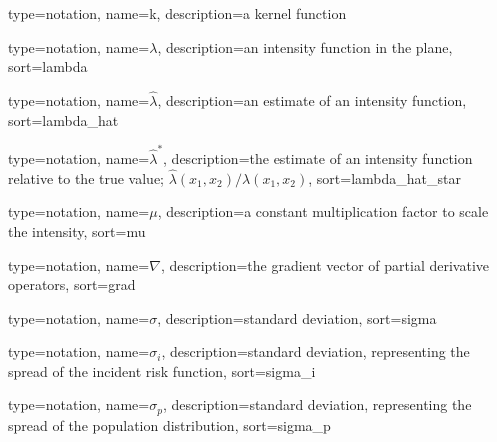 


{%
   type=notation,
   name={k},
   description={a kernel function}
}

{%
   type=notation,
   name={\ensuremath{\lambda}},
   description={an intensity function in the plane},
   sort={lambda}
}

{%
   type=notation,
   name={\ensuremath{\hat{\lambda}}},
   description={an estimate of an intensity function},
   sort={lambda_hat}
}

{%
   type=notation,
   name={\ensuremath{\hat{\lambda}^*}},
   description={the estimate of an intensity function relative to the true value; \ensuremath{\hat{\lambda}(x_1, x_2)/\lambda(x_1, x_2)}},
   sort={lambda_hat_star}
}

{%
   type=notation,
   name={\ensuremath{\mu}},
   description={a constant multiplication factor to scale the intensity},
   sort={mu}
}

{%
   type=notation,
   name={\ensuremath{\nabla}},
   description={the gradient vector of partial derivative operators},
   sort={grad}
}

{%
   type=notation,
   name={\ensuremath{\sigma}},
   description={standard deviation},
   sort={sigma}
}

{%
   type=notation,
   name={\ensuremath{\sigma_i}},
   description={standard deviation, representing the spread of the incident risk function},
   sort={sigma_i}
}

{%
   type=notation,
   name={\ensuremath{\sigma_p}},
   description={standard deviation, representing the spread of the population distribution},
   sort={sigma_p}
}



